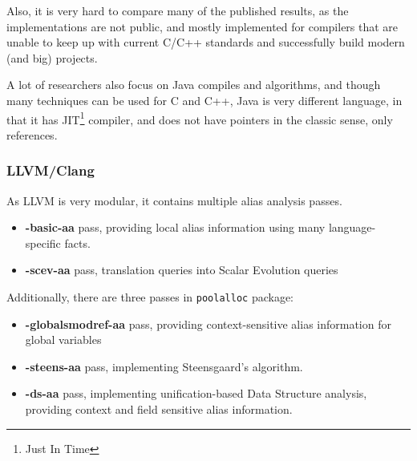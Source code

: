 Also, it is very hard to compare many of the published results, as the
implementations are not public, and mostly implemented for compilers that are
unable to keep up with current C/C++ standards and successfully build modern
(and big) projects.

A lot of researchers also focus on Java compiles and algorithms, and though many
techniques can be used for C and C++, Java is very different language, in that
it has JIT\footnote{Just In Time} compiler, and does not have pointers in the
classic sense, only references. 

\subsubsection{LLVM/Clang}

As LLVM is very modular, it contains multiple alias analysis passes. 

\begin{itemize}
	\item {\bf -basic-aa} pass, providing local alias information using many
		language-specific facts.
	\item {\bf -scev-aa} pass, translation queries into Scalar Evolution queries
\end{itemize}

Additionally, there are three passes in {\tt poolalloc} package:

\begin{itemize}
	\item {\bf -globalsmodref-aa} pass, providing context-sensitive alias
		information for global variables
	\item {\bf -steens-aa} pass, implementing Steensgaard's algorithm.
	\item {\bf -ds-aa} pass, implementing unification-based Data Structure
		analysis, providing context and field sensitive alias information.
\end{itemize}


